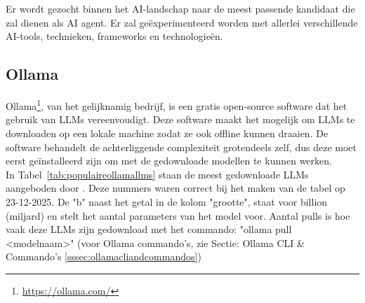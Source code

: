 \chapter{}%
\label{ch:vergelijkende-studie}

Er wordt gezocht binnen het AI-landschap naar de meest passende kandidaat die zal dienen als AI agent. Er zal geëxperimenteerd worden met allerlei verschillende AI-tools, technieken, frameworks en technologieën.

\section{Ollama}%
\label{sec:Ollama}

Ollama\footnote{\href{https://ollama.com/}{https://ollama.com/}}, van het gelijknamig bedrijf, is een gratis open-source software dat het gebruik van LLMs vereenvoudigt. Deze software maakt het mogelijk om LLMs te downloaden op een lokale machine zodat ze ook offline kunnen draaien. De software  behandelt de achterliggende complexiteit grotendeels zelf, dus deze moet eerst geïnstalleerd zijn om met de gedownloade modellen te kunnen werken.\\

In Tabel~\ref{tab:populaireollamallms} staan de meest gedownloade LLMs aangeboden door  \autocite{Ollama}. Deze nummers waren correct bij het maken van de tabel op 23-12-2025. De "b" naast het getal in de kolom "grootte", staat voor billion (miljard) en stelt het aantal parameters van het model voor. Aantal pulls is hoe vaak deze LLMs zijn gedownload met het commando: "ollama pull <modelnaam>" (voor Ollama commando's, zie Sectie: Ollama CLI \& Commando's \ref{sssec:ollamacliandcommandos})

